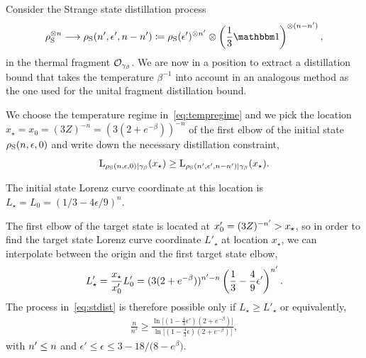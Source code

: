 \documentclass[pra,
aps,
twocolumn,
superscriptaddress,
groupedaddress,
nofootinbib,
reprint
]{revtex4-1}
\begin{document}
Consider the Strange state distillation process
\begin{equation}\label{eq:stdist}
	\noisys\too{n} \longrightarrow \noisys(\tt, \epsilon', n - n') \coloneqq  \noisys(\epsilon')\too{\tt} \otimes \left( \frac{1}{3}\id \right)\too{(n-\tt)},
\end{equation}
in the thermal fragment $\O_{\gamma_\beta}$.
We are now in a position to extract a distillation bound that takes the temperature $\beta^{-1}$ into account in an analogous method as the one used for the unital fragment distillation bound.

We choose the temperature regime in~\cref{eq:tempregime} and we pick the location $x_\star = x_0 = (3Z)^{-n} = (3(2+e^{-\beta}))^{-n}$ of the first elbow of the initial state $\noisys(n, \epsilon, 0)$ and write down the necessary distillation constraint, 
\begin{equation}
	\lc{\noisys(n, \epsilon, 0)}{\gamma_\beta}(x_\star) \geq \lc{\noisys(\tt, \epsilon', n-\tt)}{\gamma_\beta}(x_\star).
\end{equation}

The initial state Lorenz curve coordinate at this location is $L_\star = L_0 = (1/3 - 4\epsilon/9)^{n}$.

The first elbow of the target state is located at $x'_0 = (3Z)^{-\tt} > x_\star$, so in order to find the target state Lorenz curve coordinate $L'_\star$ at location $x_\star$, we can interpolate between the origin and the first target state elbow, 
\begin{equation}\label{eq:constraint_deriv_temp}
	L'_\star = \frac{x_\star}{x'_0}L'_0 = (3(2+e^{-\beta}))^{\tt-n} \left( \frac{1}{3} - \frac{4}{9} \epsilon' \right)^{\tt}.
\end{equation}
The process in~\cref{eq:stdist} is therefore possible only if $L_\star \geq L'_\star$ or equivalently,
\begin{align}
	\frac{n}{n'} \geq \frac{\ln{\Big[ (1-\frac{4}{3}\epsilon')(2+e^{-\beta}) \Big]}}{\ln{\Big[ (1-\frac{4}{3}\epsilon)(2+e^{-\beta}) \Big]}},
\end{align}
with $\tt \leq n$ and $\epsilon' \leq \epsilon \leq 3 - 18/\big(8-e^{\beta}\big)$.
\end{document}
